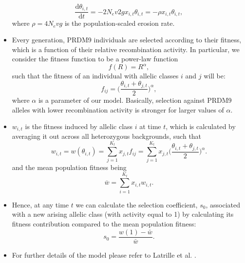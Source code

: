 \documentclass[a4paper,10pt]{article}
\begin{document}
\begin{itemize}
 \begin{equation}
  \dfrac{\mathrm{d} \theta_{i,t}}{\mathrm{d}t} = - 2 N_e v 2 g x_{i,t} \theta_{i,t} = - \rho x_{i,t} \theta_{i,t},
 \end{equation}
 where $\rho = 4 N_e vg$ is the population-scaled erosion rate.
\item Every generation, PRDM9 individuals are selected according to their fitness, which is a function of their relative recombination activity. In particular, we consider the fitness function to be a power-law function
\begin{equation}
 f(R)=R^\alpha,
\end{equation}
such that the fitness of an individual with allelic classes $i$ and $j$ will be:
\begin{equation}
 f_{ij}=\bigg(\dfrac{\theta_{i,t} + \theta_{j,t}}{2}\bigg)^\alpha,
\end{equation}
where $\alpha$ is a parameter of our model. Basically, selection against PRDM9 alleles with lower recombination activity is stronger for larger values of $\alpha$.
\item $w_{i,t}$ is the fitness induced by allelic class $i$ at time $t$, which is calculated by averaging it out across all heterozygous backgrounds, such that
\begin{equation}
 w_{i,t} = w(\theta_{i,t})=\sum_{j=1}^{K_t}{x_{j,t}f_{ij}}=\sum_{j=1}^{K_t}{x_{j,t}\bigg(\dfrac{\theta_{i,t}+\theta_{j,t}}{2}\bigg)^\alpha}.
\end{equation}
and the mean population fitness being
\begin{equation}
 \bar{w} = \sum_{i=1}^{K_t}{x_{i,t}w_{i,t}}.
\end{equation}
\item Hence, at any time $t$ we can calculate the selection coefficient, $s_0$, associated with a new arising allelic class (with activity equal to 1) by calculating its fitness contribution compared to the mean population fitness:
\begin{equation}
 s_0 = \dfrac{w(1) - \bar{w}}{\bar{w}}.
\end{equation}
\item For further details of the model please refer to Latrille et al. \cite{Latrille2017}.


\end{itemize}
\end{document}
